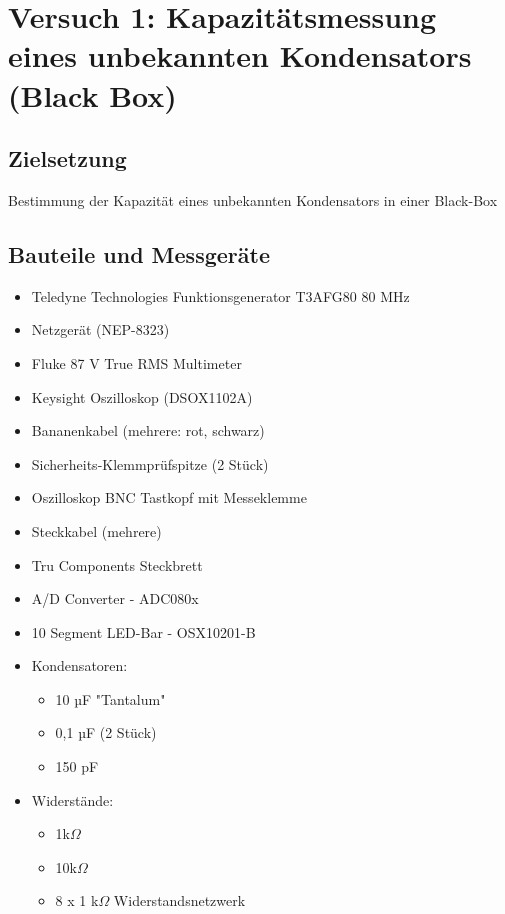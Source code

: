 \documentclass[a4paper,12pt]{article}
\begin{document}
\newpage

\section{Versuch 1: Kapazitätsmessung eines unbekannten Kondensators (Black Box)}

\subsection{Zielsetzung}
Bestimmung der Kapazität eines unbekannten Kondensators in einer Black-Box

\subsection{Bauteile und Messgeräte}
\begin{itemize}
\item Teledyne Technologies Funktionsgenerator T3AFG80 80 MHz
\item Netzgerät (NEP-8323)
\item Fluke 87 V True RMS Multimeter
\item Keysight Oszilloskop (DSOX1102A)
\item Bananenkabel (mehrere: rot, schwarz)
\item Sicherheits-Klemmprüfspitze (2 Stück)
\item Oszilloskop BNC Tastkopf mit Messeklemme
\item Steckkabel (mehrere)
\item Tru Components Steckbrett\\
\end{itemize}


\begin{itemize}
\item A/D Converter - ADC080x
\item 10 Segment LED-Bar - OSX10201-B
\newpage
\item Kondensatoren: 
	\begin{itemize}
	\item 10 µF "Tantalum"
	\item 0,1 µF (2 Stück)
	\item 150 pF
	\end{itemize}
\item Widerstände: 
	\begin{itemize}
	\item 1k$\Omega$
	\item 10k$\Omega$
	\item 8 x 1 k$\Omega$ Widerstandsnetzwerk
	\end{itemize}
\end{itemize}
\end{document}
